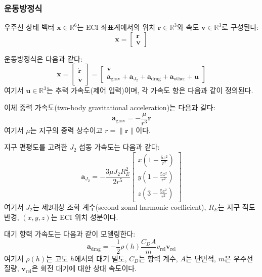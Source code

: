 \documentclass[a4paper,fleqn]{cas-dc}
\begin{document}
\subsubsection{운동방정식}

우주선 상태 벡터 $\mathbf{x} \in \mathbb{R}^6$는 ECI 좌표계에서의 위치 $\mathbf{r} \in \mathbb{R}^3$와 속도 $\mathbf{v} \in \mathbb{R}^3$로 구성된다:
\begin{equation}
\mathbf{x} = \begin{bmatrix} \mathbf{r} \\ \mathbf{v} \end{bmatrix}
\end{equation}

운동방정식은 다음과 같다:
\begin{equation}\label{eq:eom}
\dot{\mathbf{x}} = \begin{bmatrix} \dot{\mathbf{r}} \\ \dot{\mathbf{v}} \end{bmatrix} = \begin{bmatrix} \mathbf{v} \\ \mathbf{a}_{\text{grav}} + \mathbf{a}_{J_2} + \mathbf{a}_{\text{drag}} + \mathbf{a}_{\text{other}} + \mathbf{u} \end{bmatrix}
\end{equation}
여기서 $\mathbf{u} \in \mathbb{R}^3$는 추력 가속도(제어 입력)이며, 각 가속도 항은 다음과 같이 정의된다.

이체 중력 가속도(two-body gravitational acceleration)는 다음과 같다:
\begin{equation}
\mathbf{a}_{\text{grav}} = -\frac{\mu}{r^3}\mathbf{r}
\end{equation}
여기서 $\mu$는 지구의 중력 상수이고 $r = \|\mathbf{r}\|$이다.

지구 편평도를 고려한 $J_2$ 섭동 가속도는 다음과 같다:
\begin{equation}
\mathbf{a}_{J_2} = -\frac{3\mu J_2 R_E^2}{2r^5} \begin{bmatrix}
x\left(1 - \frac{5z^2}{r^2}\right) \\[4pt]
y\left(1 - \frac{5z^2}{r^2}\right) \\[4pt]
z\left(3 - \frac{5z^2}{r^2}\right)
\end{bmatrix}
\end{equation}
여기서 $J_2$는 제2대상 조화 계수(second zonal harmonic coefficient), $R_E$는 지구 적도 반경, $(x, y, z)$는 ECI 위치 성분이다.

대기 항력 가속도는 다음과 같이 모델링한다:
\begin{equation}
\mathbf{a}_{\text{drag}} = -\frac{1}{2}\rho(h) \frac{C_D A}{m} v_{\text{rel}} \mathbf{v}_{\text{rel}}
\end{equation}
여기서 $\rho(h)$는 고도 $h$에서의 대기 밀도, $C_D$는 항력 계수, $A$는 단면적, $m$은 우주선 질량, $\mathbf{v}_{\text{rel}}$은 회전 대기에 대한 상대 속도이다.
\end{document}
